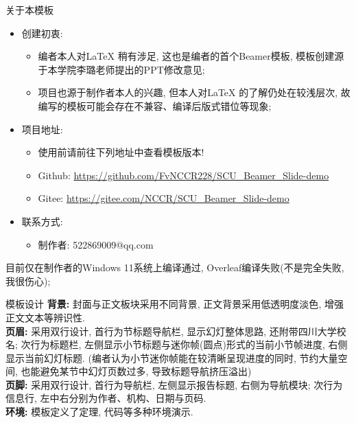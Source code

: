 \documentclass[hyperref,UTF8,11pt,CJK]{beamer}
\begin{document}
\begin{frame}{关于本模板}%
	\begin{itemize}
		\item 创建初衷:
		\begin{itemize}
			\item 编者本人对\LaTeX{} 稍有涉足, 这也是编者的首个Beamer模板, 模板创建源于本学院李璐老师提出的PPT修改意见;
			\item 项目也源于制作者本人的兴趣, 但本人对\LaTeX{} 的了解仍处在较浅层次, 故编写的模板可能会存在不兼容、编译后版式错位等现象;
		\end{itemize}
		\item 项目地址:
		\begin{itemize}
			\item 使用前请前往下列地址中查看模板版本!
			\item Github: {\color{BSblue}\url{https://github.com/FvNCCR228/SCU_Beamer_Slide-demo}}
			\item Gitee: \color{BSblue}\url{https://gitee.com/NCCR/SCU_Beamer_Slide-demo}
		\end{itemize}
		\item 联系方式:
		\begin{itemize}
			\item 制作者: 522869009@qq.com
		\end{itemize}
	\end{itemize}
	目前仅在制作者的Windows 11系统上编译通过, Overleaf编译失败(不是完全失败, 我很伤心);
\end{frame}

\begin{frame}{模板设计}
	\textbf{背景:} 封面与正文板块采用{\color{JXred}不同背景}, 正文背景采用{\color{JXred}低透明度淡色}, 增强正文文本等辨识性.\\[1ex]
	\textbf{页眉:} 采用双行设计, 首行为{\color{JXred}节标题导航栏}, 显示幻灯整体思路, 还附带四川大学校名; 次行为标题栏, 左侧显示{\color{JXred}小节标题}与{\color{JXred}迷你帧(圆点)形式的当前小节帧进度}, 右侧显示当前{\color{JXred}幻灯标题}. (编者认为小节迷你帧能在较清晰呈现进度的同时, 节约大量空间, 也能避免某节中幻灯页数过多, 导致标题导航挤压溢出)\\[1ex]
	\textbf{页脚:} 采用双行设计, 首行为导航栏, 左侧显示{\color{JXred}报告标题}, 右侧为{\color{JXred}导航模块}; 次行为信息行, 左中右分别为{\color{JXred}作者}、{\color{JXred}机构}、{\color{JXred}日期与页码}.\\[1ex]
	\textbf{环境:} 模板定义了{\color{JXred}定理}, {\color{JXred}代码}等多种环境演示.
\end{frame}
\end{document}
